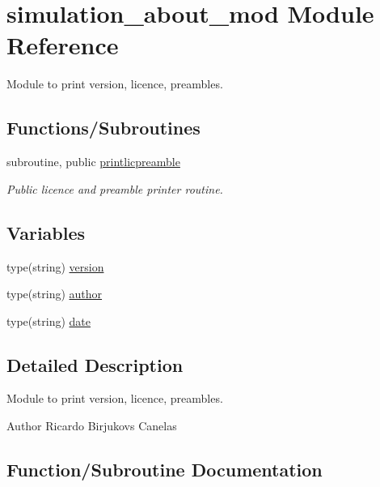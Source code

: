 \hypertarget{namespacesimulation__about__mod}{}\section{simulation\+\_\+about\+\_\+mod Module Reference}
\label{namespacesimulation__about__mod}


Module to print version, licence, preambles.  


\subsection*{Functions/\+Subroutines}
\begin{DoxyCompactItemize}
\item 
subroutine, public \mbox{\hyperlink{namespacesimulation__about__mod_ac436e98649d7488280cd176bbe765931}{printlicpreamble}}
\begin{DoxyCompactList}\small\item\em Public licence and preamble printer routine. \end{DoxyCompactList}\end{DoxyCompactItemize}
\subsection*{Variables}
\begin{DoxyCompactItemize}
\item 
type(string) \mbox{\hyperlink{namespacesimulation__about__mod_aa52b892695e36d427843d6e035b37d36}{version}}
\item 
type(string) \mbox{\hyperlink{namespacesimulation__about__mod_a49c4e8683dee7c3a2cd52658879c6e38}{author}}
\item 
type(string) \mbox{\hyperlink{namespacesimulation__about__mod_ad2ae0e434e2c6b0221094f181a538dc6}{date}}
\end{DoxyCompactItemize}


\subsection{Detailed Description}
Module to print version, licence, preambles. 

\begin{DoxyAuthor}{Author}
Ricardo Birjukovs Canelas 
\end{DoxyAuthor}


\subsection{Function/\+Subroutine Documentation}
\mbox{\label{namespacesimulation__about__mod_ac436e98649d7488280cd176bbe765931}} 
